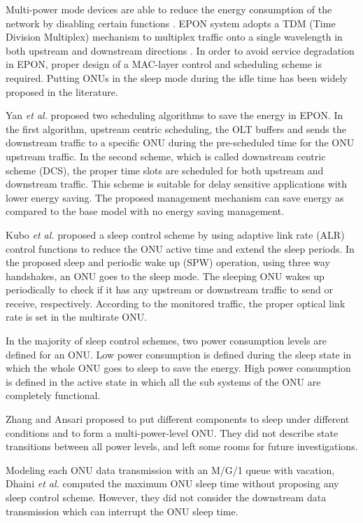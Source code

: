 \documentclass[11pt,english,12pt,onecolumn, draftcls]{IEEEtran}
\theoremstyle{plain}
\theoremstyle{definition}
\begin{document}
Multi-power mode devices are able to reduce the energy consumption of the network by disabling certain functions \cite{Gupta2007}. EPON system adopts a TDM (Time Division Multiplex) mechanism to multiplex traffic onto a single wavelength in both upstream and downstream directions \cite{Luo2007}. In order to avoid service degradation in EPON, proper design of a MAC-layer control and scheduling scheme is required. Putting ONUs in the sleep mode during the idle time has been widely proposed in the literature.

Yan \emph{et al.} \cite{yan2010energy} proposed two scheduling algorithms to save the energy in EPON. In the first algorithm, upstream centric scheduling, the OLT buffers and sends the downstream traffic to a specific ONU during the pre-scheduled time for the ONU upstream traffic. In the second scheme, which is called downstream centric scheme (DCS), the proper time slots are scheduled for both upstream and downstream traffic. This scheme is suitable for delay sensitive applications with lower energy saving. The proposed management mechanism can save  energy as compared to the base model with no energy saving management.

Kubo \emph{et al.} \cite{KubStu10} proposed a sleep control scheme by using adaptive link rate (ALR) control functions to reduce the ONU active time and extend the sleep periods. In the proposed sleep and periodic wake up (SPW) operation, using three way handshakes, an ONU goes to the sleep mode. The sleeping ONU wakes up periodically to check if it has any upstream or downstream traffic to send or receive, respectively. According to the monitored traffic,  the proper optical link rate is set in the multirate ONU.

In the majority of sleep control schemes, two power consumption levels are defined for an ONU. Low power consumption is defined during the sleep state in which the whole ONU goes to sleep to save the energy. High power consumption is defined in the active state in which all the sub systems of the ONU are completely functional.

Zhang and Ansari \cite{ZhaTow11} proposed to put different components to sleep under different conditions and to form a multi-power-level ONU. They did not describe state transitions between all power levels, and left some rooms for future investigations.

Modeling each ONU data transmission with an M/G/1 queue with vacation, Dhaini \emph{et al.} \cite{Dhaini11} computed the maximum ONU sleep time without proposing any sleep control scheme. However, they did not consider the downstream data transmission which can interrupt the ONU sleep time.
\end{document}
